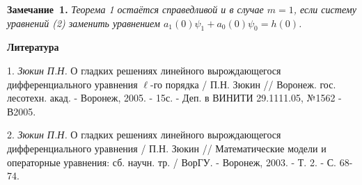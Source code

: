 \textbf{Замечание~1.} {\it Теорема 1 остаётся справедливой и в случае $m=1$, если систему уравнений (2) заменить уравнением $a_1(0)\psi_1+a_0(0)\psi_0=h(0)$.}



\smallskip \centerline{\bf Литература}\nopagebreak

1. {\it Зюкин П.Н.} О гладких решениях линейного вырождающегося дифференциального уравнения $\ell$-го порядка / П.Н. Зюкин // Воронеж. гос. лесотехн. акад. - Воронеж, 2005. - 15с. - Деп. в ВИНИТИ 29.1111.05, №1562 - В2005.

2. {\it Зюкин П.Н.} О гладких решениях линейного вырождающегося дифференциального уравнения / П.Н. Зюкин // Математические модели и операторные уравнения: сб. научн. тр. / ВорГУ. - Воронеж, 2003. - Т. 2. - С. 68-74.

